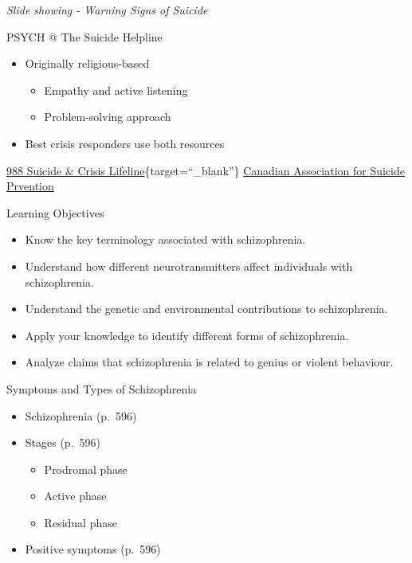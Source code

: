 \documentclass[
]{book}
\providecommand{\tightlist}{%
  \setlength{\itemsep}{0pt}\setlength{\parskip}{0pt}}
\begin{document}
\begin{reflect}
\emph{Slide showing - Warning Signs of Suicide}

PSYCH @ The Suicide Helpline

\begin{itemize}
\tightlist
\item
  Originally religious-based

  \begin{itemize}
  \tightlist
  \item
    Empathy and active listening\\
  \item
    Problem-solving approach\\
  \end{itemize}
\item
  Best crisis responders use both resources
\end{itemize}

\href{http://www.suicidepreventionlifeline.org/}{988 Suicide \& Crisis Lifeline}\{target=``\_blank''\}
\href{http://suicideprevention.ca/need-help/}{Canadian Association for Suicide Prvention}

Learning Objectives

\begin{itemize}
\tightlist
\item
  Know the key terminology associated with schizophrenia.\\
\item
  Understand how different neurotransmitters affect individuals with schizophrenia.\\
\item
  Understand the genetic and environmental contributions to schizophrenia.\\
\item
  Apply your knowledge to identify different forms of schizophrenia.\\
\item
  Analyze claims that schizophrenia is related to genius or violent behaviour.
\end{itemize}

Symptoms and Types of Schizophrenia

\begin{itemize}
\tightlist
\item
  Schizophrenia (p.~596)\\
\item
  Stages (p.~596)

  \begin{itemize}
  \tightlist
  \item
    Prodromal phase\\
  \item
    Active phase\\
  \item
    Residual phase\\
  \end{itemize}
\item
  Positive symptoms (p.~596)


\end{itemize}
\end{reflect}
\end{document}
